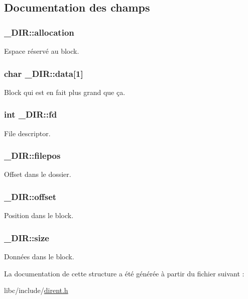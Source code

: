 \subsection{Documentation des champs}
\hypertarget{struct__DIR_a395fdd86b324fd71725a24e4f6edd55c}{
\subsubsection[{allocation}]{ \-\_\-\-D\-I\-R\-::allocation}}\label{struct__DIR_a395fdd86b324fd71725a24e4f6edd55c}
Espace réservé au block. \hypertarget{struct__DIR_a87bb023e0bf0b2f075e90d270ff7033e}{
\subsubsection[{data}]{\setlength{\rightskip}{0pt plus 5cm}char \-\_\-\-D\-I\-R\-::data\mbox{[}1\mbox{]}}}\label{struct__DIR_a87bb023e0bf0b2f075e90d270ff7033e}
Block qui est en fait plus grand que ça. \hypertarget{struct__DIR_a1ee17b3cb06ddc80fb648e65c8353c55}{
\subsubsection[{fd}]{\setlength{\rightskip}{0pt plus 5cm}int \-\_\-\-D\-I\-R\-::fd}}\label{struct__DIR_a1ee17b3cb06ddc80fb648e65c8353c55}
File descriptor. \hypertarget{struct__DIR_a759e6f1c2754b12a4aba9d120f3d1e57}{
\subsubsection[{filepos}]{ \-\_\-\-D\-I\-R\-::filepos}}\label{struct__DIR_a759e6f1c2754b12a4aba9d120f3d1e57}
Offset dans le dossier. \hypertarget{struct__DIR_a298b074b577743d5c726b4fdc2917795}{
\subsubsection[{offset}]{ \-\_\-\-D\-I\-R\-::offset}}\label{struct__DIR_a298b074b577743d5c726b4fdc2917795}
Position dans le block. \hypertarget{struct__DIR_a117676c5eb31163a8b99520bd2cbf1aa}{
\subsubsection[{size}]{ \-\_\-\-D\-I\-R\-::size}}\label{struct__DIR_a117676c5eb31163a8b99520bd2cbf1aa}
Données dans le block. 

La documentation de cette structure a été générée à partir du fichier suivant \-:\begin{DoxyCompactItemize}
\item 
libc/include/\hyperlink{dirent_8h}{dirent.\-h}\end{DoxyCompactItemize}
